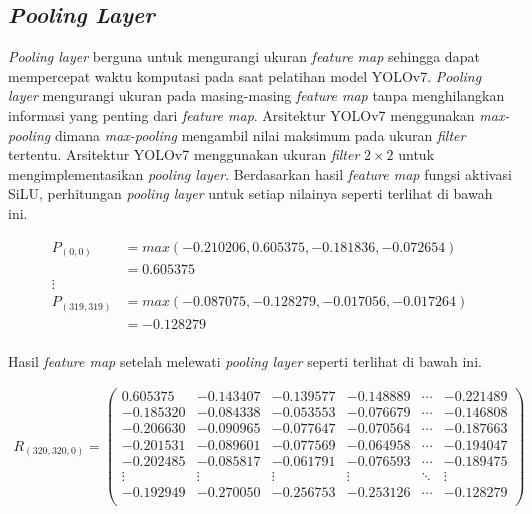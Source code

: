     \subsection{\textit{Pooling Layer}}

    \textit{Pooling layer} berguna untuk mengurangi ukuran \textit{feature map} sehingga dapat mempercepat waktu komputasi pada saat pelatihan model YOLOv7. \textit{Pooling layer} mengurangi ukuran pada masing-masing \textit{feature map} tanpa menghilangkan informasi yang penting dari \textit{feature map}. Arsitektur YOLOv7 menggunakan \textit{max-pooling} dimana \textit{max-pooling} mengambil nilai maksimum pada ukuran \textit{filter} tertentu. Arsitektur YOLOv7 menggunakan ukuran \textit{filter} $2\times 2$ untuk mengimplementasikan \textit{pooling layer}. Berdasarkan hasil \textit{feature map} fungsi aktivasi SiLU, perhitungan \textit{pooling layer} untuk setiap nilainya seperti terlihat di bawah ini.

    \begin{align*}
        P_{(0, 0)}      &= max(-0.210206, 0.605375, -0.181836, -0.072654)\\
                        &= 0.605375 \\
        \vdots \\
        P_{(319, 319)}  &= max(-0.087075, -0.128279, -0.017056, -0.017264)\\
                        &= -0.128279 \\
    \end{align*}

    Hasil \textit{feature map} setelah melewati \textit{pooling layer} seperti terlihat di bawah ini.

    \begin{align*}
        R_{(320, 320, 0)} = 
        \begin{pmatrix}
            0.605375  & -0.143407 & -0.139577 & -0.148889 & \cdots & -0.221489 \\
            -0.185320 & -0.084338 & -0.053553 & -0.076679 & \cdots & -0.146808 \\
            -0.206630 & -0.090965 & -0.077647 & -0.070564 & \cdots & -0.187663 \\
            -0.201531 & -0.089601 & -0.077569 & -0.064958 & \cdots & -0.194047 \\
            -0.202485 & -0.085817 & -0.061791 & -0.076593 & \cdots & -0.189475 \\
            \vdots    & \vdots    & \vdots    & \vdots    & \ddots & \vdots \\
            -0.192949 & -0.270050 & -0.256753 & -0.253126 & \cdots & -0.128279 \\
        \end{pmatrix}
    \end{align*}

